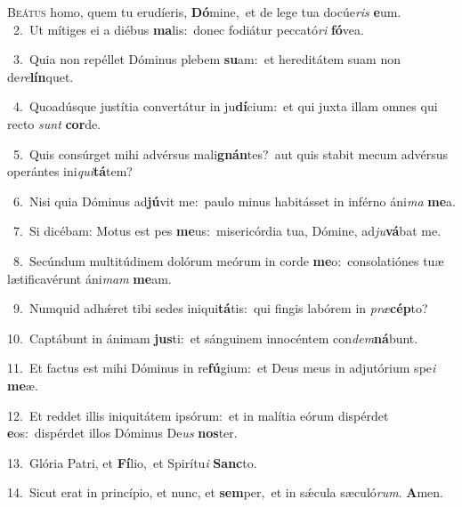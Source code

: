 \lettrine{\initial\textcolor{\initialcolor}{B}}{eátus} homo, quem tu erudíeris, \textbf{Dó}\-mine,~\star et de lege tua docúe\textit{ris} \textbf{e}\-um.\\
{\numbfont\textcolor{\numbcolor}{~2.}}~Ut mítiges ei a diébus \textbf{ma}\-lis:~\star donec fodiátur peccató\textit{ri} \textbf{fó}\-vea.\par
{\numbfont\textcolor{\numbcolor}{~3.}}~Quia non repéllet Dóminus plebem \textbf{su}\-am:~\star et hereditátem suam non de\-\textit{re}\-\textbf{lín}quet.\par
{\numbfont\textcolor{\numbcolor}{~4.}}~Quoadúsque justítia convertátur in ju\-\textbf{dí}\-cium:~\star et qui juxta illam omnes qui recto \textit{sunt} \textbf{cor}\-de.\par
{\numbfont\textcolor{\numbcolor}{~5.}}~Quis consúrget mihi advérsus mali\-\textbf{gnán}\-tes?~\star aut quis stabit mecum advérsus operántes ini\-\textit{qui}\-\textbf{tá}tem?\par
{\numbfont\textcolor{\numbcolor}{~6.}}~Nisi quia Dóminus ad\-\textbf{jú}\-vit me:~\star paulo minus habitásset in inférno áni\textit{ma} \textbf{me}\-a.\par
{\numbfont\textcolor{\numbcolor}{~7.}}~Si dicébam: Motus est pes \textbf{me}\-us:~\star misericórdia tua, Dómine, ad\-\textit{ju}\-\textbf{vá}bat me.\par
{\numbfont\textcolor{\numbcolor}{~8.}}~Secúndum multitúdinem dolórum meórum in corde \textbf{me}\-o:~\star consolatiónes tuæ lætificavérunt áni\textit{mam} \textbf{me}\-am.\par
{\numbfont\textcolor{\numbcolor}{~9.}}~Numquid adhǽret tibi sedes iniqui\-\textbf{tá}\-tis:~\star qui fingis labórem in \textit{præ}\-\textbf{cép}to?\par
{\numbfont\textcolor{\numbcolor}{10.}}~Captábunt in ánimam \textbf{jus}\-ti:~\star et sánguinem innocéntem con\-\textit{dem}\-\textbf{ná}bunt.\par
{\numbfont\textcolor{\numbcolor}{11.}}~Et factus est mihi Dóminus in re\-\textbf{fú}\-gium:~\star et Deus meus in adjutórium spe\textit{i} \textbf{me}\-æ.\par
{\numbfont\textcolor{\numbcolor}{12.}}~Et reddet illis iniquitátem ipsórum:~\dagger et in malítia eórum dispérdet \textbf{e}\-os:~\star dispérdet illos Dóminus De\textit{us} \textbf{nos}\-ter.\par
{\numbfont\textcolor{\numbcolor}{13.}}~Glória Patri, et \textbf{Fí}\-lio,~\star et Spirítu\textit{i} \textbf{Sanc}\-to.\par
{\numbfont\textcolor{\numbcolor}{14.}}~Sicut erat in princípio, et nunc, et \textbf{sem}\-per,~\star et in sǽcula sæculó\-\textit{rum}\-. \textbf{A}\-men.\par
